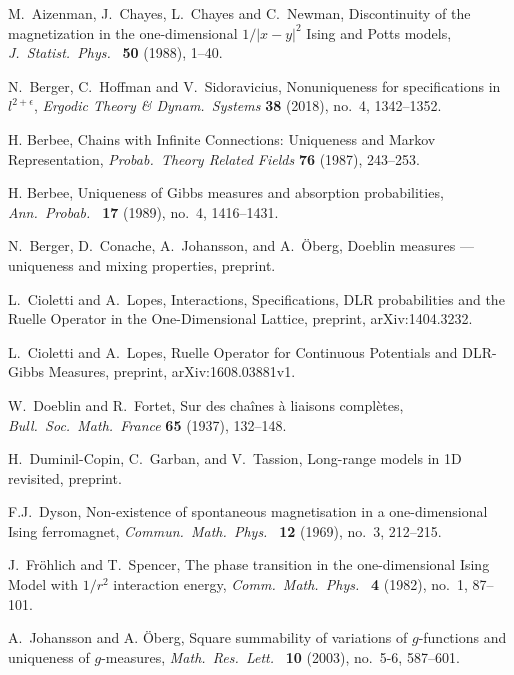 \documentclass[11pt, a4paper]{amsart}
\theoremstyle{definition}
\theoremstyle{remark}
\begin{document}
\begin{thebibliography}{999}

   M.\ Aizenman, J.\ Chayes, L.\ Chayes and C.\ Newman,
  Discontinuity of the magnetization in the one-dimensional $1/|x-y|^2$ Ising
  and Potts models, {\em J.\ Statist.\ Phys.\ } {\bf 50} (1988), 1--40.
    
   N.\ Berger, C.\ Hoffman and V.\ Sidoravicius, Nonuniqueness
  for specifications in $l^{2+\epsilon}$, {\em Ergodic Theory \& Dynam.\
    Systems} {\bf 38} (2018), no.\ 4, 1342--1352.

   H. Berbee, Chains with Infinite Connections: Uniqueness and
  Markov Representation, {\em Probab.\ Theory Related Fields} {\bf 76} (1987),
  243--253.
 
   H. Berbee, Uniqueness of Gibbs measures and absorption
  probabilities, {\em Ann.\ Probab.\ } {\bf 17} (1989), no.\ 4, 1416--1431.
 
   N.\ Berger, D.\ Conache, A.\ Johansson, and A.\ \"Oberg,
  Doeblin measures --- uniqueness and mixing properties, preprint.
 
   L.\ Cioletti and A.\ Lopes, Interactions, Specifications, DLR
  probabilities and the Ruelle Operator in the One-Dimensional Lattice,
  preprint, arXiv:1404.3232.
 
   L.\ Cioletti and A.\ Lopes, Ruelle Operator for Continuous
  Potentials and DLR-Gibbs Measures, preprint, arXiv:1608.03881v1.
  
   W.\ Doeblin and R.\ Fortet, Sur des cha{\^i}nes {\`a}
  liaisons compl{\`e}tes, {\em Bull.\ Soc.\ Math.\ France} {\bf 65} (1937),
  132--148.
  
   H.\ Duminil-Copin, C.\ Garban, and V.\ Tassion, Long-range
  models in 1D revisited, preprint.

   F.J.\ Dyson, Non-existence of spontaneous magnetisation in a
  one-dimensional Ising ferromagnet, {\em Commun.\ Math.\ Phys.\ } {\bf 12}
  (1969), no.\ 3, 212--215.

 
   J.\ Fr\"ohlich and T.\ Spencer, The phase transition in the
  one-dimensional Ising Model with $1/r^2$ interaction energy, {\em Comm.\
    Math.\ Phys.\ } {\bf 4} (1982), no.\ 1, 87--101.

   A.\ Johansson and A. \"Oberg, Square summability of variations
  of $g$-functions and uniqueness of $g$-measures, {\em Math.\ Res.\ Lett.\ }
  {\bf 10} (2003), no.\ 5-6, 587--601.
    

\end{thebibliography}
\end{document}
